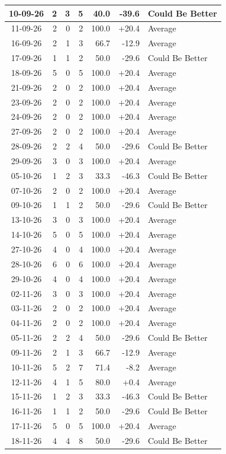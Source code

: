 \documentclass[journal]{IEEEtran}
\numberwithin{equation}{subsection}
\begin{document}
\begin{longtable}{|c|r|r|r|r|r|l|}
10-09-26 & 2 & 3 & 5 & 40.0 & -39.6 & Could Be Better\\ \hline
11-09-26 & 2 & 0 & 2 & 100.0 & +20.4 & Average\\ \hline
16-09-26 & 2 & 1 & 3 & 66.7 & -12.9 & Average\\ \hline
17-09-26 & 1 & 1 & 2 & 50.0 & -29.6 & Could Be Better\\ \hline
18-09-26 & 5 & 0 & 5 & 100.0 & +20.4 & Average\\ \hline
21-09-26 & 2 & 0 & 2 & 100.0 & +20.4 & Average\\ \hline
23-09-26 & 2 & 0 & 2 & 100.0 & +20.4 & Average\\ \hline
24-09-26 & 2 & 0 & 2 & 100.0 & +20.4 & Average\\ \hline
27-09-26 & 2 & 0 & 2 & 100.0 & +20.4 & Average\\ \hline
28-09-26 & 2 & 2 & 4 & 50.0 & -29.6 & Could Be Better\\ \hline
29-09-26 & 3 & 0 & 3 & 100.0 & +20.4 & Average\\ \hline
05-10-26 & 1 & 2 & 3 & 33.3 & -46.3 & Could Be Better\\ \hline
07-10-26 & 2 & 0 & 2 & 100.0 & +20.4 & Average\\ \hline
09-10-26 & 1 & 1 & 2 & 50.0 & -29.6 & Could Be Better\\ \hline
13-10-26 & 3 & 0 & 3 & 100.0 & +20.4 & Average\\ \hline
14-10-26 & 5 & 0 & 5 & 100.0 & +20.4 & Average\\ \hline
27-10-26 & 4 & 0 & 4 & 100.0 & +20.4 & Average\\ \hline
28-10-26 & 6 & 0 & 6 & 100.0 & +20.4 & Average\\ \hline
29-10-26 & 4 & 0 & 4 & 100.0 & +20.4 & Average\\ \hline
02-11-26 & 3 & 0 & 3 & 100.0 & +20.4 & Average\\ \hline
03-11-26 & 2 & 0 & 2 & 100.0 & +20.4 & Average\\ \hline
04-11-26 & 2 & 0 & 2 & 100.0 & +20.4 & Average\\ \hline
05-11-26 & 2 & 2 & 4 & 50.0 & -29.6 & Could Be Better\\ \hline
09-11-26 & 2 & 1 & 3 & 66.7 & -12.9 & Average\\ \hline
10-11-26 & 5 & 2 & 7 & 71.4 & -8.2 & Average\\ \hline
12-11-26 & 4 & 1 & 5 & 80.0 & +0.4 & Average\\ \hline
15-11-26 & 1 & 2 & 3 & 33.3 & -46.3 & Could Be Better\\ \hline
16-11-26 & 1 & 1 & 2 & 50.0 & -29.6 & Could Be Better\\ \hline
17-11-26 & 5 & 0 & 5 & 100.0 & +20.4 & Average\\ \hline
18-11-26 & 4 & 4 & 8 & 50.0 & -29.6 & Could Be Better\\ \hline

\end{longtable}
\normalsize
\end{document}
